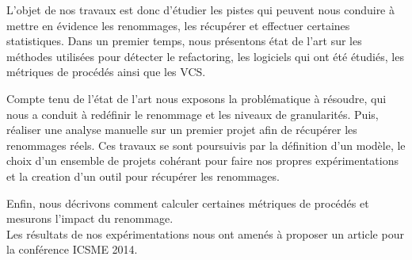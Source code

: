 L’objet de nos travaux est donc d’étudier les pistes qui peuvent nous conduire à mettre en évidence les renommages, les récupérer et effectuer certaines statistiques.
Dans un premier temps, nous présentons état de l'art sur les méthodes utilisées pour détecter le refactoring, les logiciels qui ont été étudiés, les métriques de procédés ainsi que les VCS. 

Compte tenu de l'état de l'art nous exposons la problématique à résoudre, qui nous a conduit à redéfinir le renommage et les niveaux de granularités. Puis, réaliser une analyse manuelle sur un premier projet afin de récupérer les renommages réels. Ces travaux se sont poursuivis par la définition d'un modèle, le choix d'un ensemble de projets cohérant pour faire nos propres expérimentations et la creation d'un outil pour récupérer les renommages.

 Enfin, nous décrivons comment calculer certaines métriques de procédés et mesurons l'impact du renommage.\\
 Les résultats de nos expérimentations nous ont amenés à proposer un article pour la conférence ICSME 2014.\\

